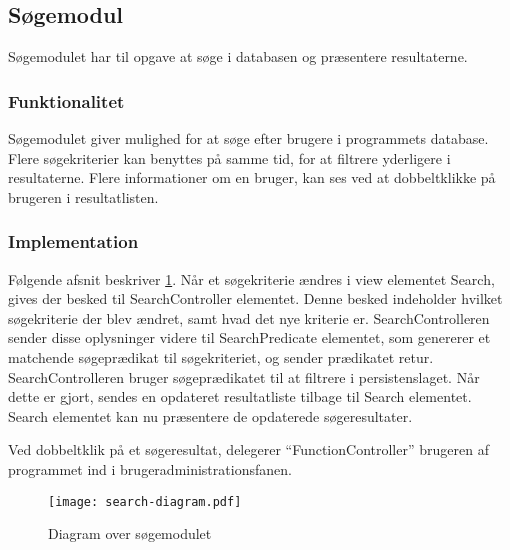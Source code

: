 \subsection{Søgemodul}
\label{sub:s_searchmodul}

Søgemodulet har til opgave at søge i databasen og præsentere resultaterne.

\subsubsection{Funktionalitet}

Søgemodulet giver mulighed for at søge efter brugere i programmets database. Flere søgekriterier kan benyttes på samme tid, for at filtrere yderligere i resultaterne. Flere informationer om en bruger, kan ses ved at dobbeltklikke på brugeren i resultatlisten.
\subsubsection{Implementation}

Følgende afsnit beskriver \cref{fig:soegemodul}. Når et søgekriterie ændres i view elementet Search, gives der besked til SearchController elementet. Denne besked indeholder hvilket søgekriterie der blev ændret, samt hvad det nye kriterie er. SearchControlleren sender disse oplysninger videre til SearchPredicate elementet, som genererer et matchende søgeprædikat til søgekriteriet, og sender prædikatet retur. SearchControlleren bruger søgeprædikatet til at filtrere i persistenslaget. Når dette er gjort, sendes en opdateret resultatliste tilbage til Search elementet. Search elementet kan nu præsentere de opdaterede søgeresultater.

Ved dobbeltklik på et søgeresultat, delegerer \enquote{FunctionController} brugeren af programmet ind i brugeradministrationsfanen.

\begin{figure}
  \centering
  \texttt{[image: search-diagram.pdf]}
  \caption{Diagram over søgemodulet} \label{fig:soegemodul}
\end{figure} 


